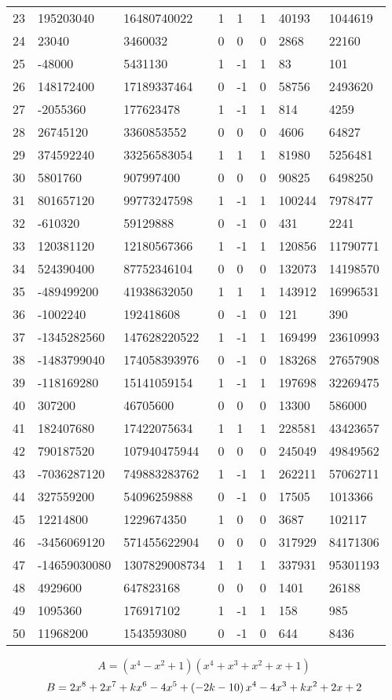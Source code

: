 \documentclass{amsart}
\begin{document}
\begin{longtable}{|l|l|l|lllll|}
23&195203040&16480740022&1&1&1&40193&1044619\\
24&23040&3460032&0&0&0&2868&22160\\
25&-48000&5431130&1&-1&1&83&101\\
26&148172400&17189337464&0&-1&0&58756&2493620\\
27&-2055360&177623478&1&-1&1&814&4259\\
28&26745120&3360853552&0&0&0&4606&64827\\
29&374592240&33256583054&1&1&1&81980&5256481\\
30&5801760&907997400&0&0&0&90825&6498250\\
31&801657120&99773247598&1&-1&1&100244&7978477\\
32&-610320&59129888&0&-1&0&431&2241\\
33&120381120&12180567366&1&-1&1&120856&11790771\\
34&524390400&87752346104&0&0&0&132073&14198570\\
35&-489499200&41938632050&1&1&1&143912&16996531\\
36&-1002240&192418608&0&-1&0&121&390\\
37&-1345282560&147628220522&1&-1&1&169499&23610993\\
38&-1483799040&174058393976&0&-1&0&183268&27657908\\
39&-118169280&15141059154&1&-1&1&197698&32269475\\
40&307200&46705600&0&0&0&13300&586000\\
41&182407680&17422075634&1&1&1&228581&43423657\\
42&790187520&107940475944&0&0&0&245049&49849562\\
43&-7036287120&749883283762&1&-1&1&262211&57062711\\
44&327559200&54096259888&0&-1&0&17505&1013366\\
45&12214800&1229674350&1&0&0&3687&102117\\
46&-3456069120&571455622904&0&0&0&317929&84171306\\
47&-14659030080&1307829008734&1&1&1&337931&95301193\\
48&4929600&647823168&0&0&0&1401&26188\\
49&1095360&176917102&1&-1&1&158&985\\
50&11968200&1543593080&0&-1&0&644&8436\\
\hline
\end{longtable}
$$A=(x^4
 - x^2
 + 1)(x^4
 + x^3
 + x^2
 + x
 + 1)$$
$$B=2\*x^8
 + 2\*x^7
 + k\*x^6
 - 4\*x^5
 + \left(-2\*k
 - 10\right) \*x^4
 - 4\*x^3
 + k\*x^2
 + 2\*x
 + 2$$
\end{document}
